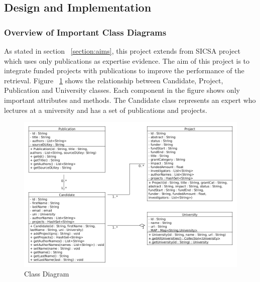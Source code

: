 


\subsection{Design and Implementation}\label{section:designandimplementation}

\subsubsection{Overview of Important Class Diagrams}

As stated in section ~\ref{section:aims}, this project extends from SICSA project which uses only publications as expertise evidence.
The aim of this project is to integrate funded projects with publications to improve the performance of the retrieval.
Figure ~\ref{fig:classDiagram1} shows the relationship between Candidate, Project, Publication and University classes. Each component in the figure
shows only important attributes and methods. The Candidate class represents an expert who lectures at a university and has a set of publications and projects.
\begin{figure}
\centering
\includegraphics[scale=0.4]{./figures/classDiagram1.png}
\caption{Class Diagram} \label{fig:classDiagram1} 
\end{figure}


